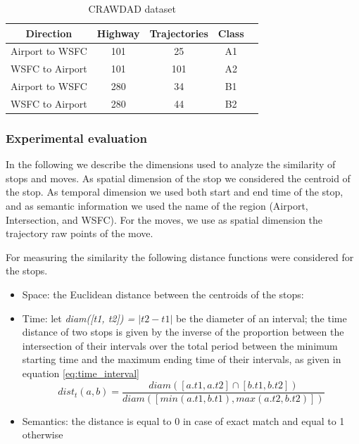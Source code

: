 \documentclass[12pt]{article}
\begin{document}
\begin{table}[h]
\scriptsize
  \centering
  \begin{tabular}{|c|c|c|c|c|}
  	\hline
 Direction & Highway & Trajectories & Class \\
  	\hline
 Airport to WSFC & 101 & 25 & A1\\
 WSFC to Airport & 101 & 101 & A2\\
 Airport to WSFC & 280 & 34 & B1\\
 WSFC to Airport & 280 & 44 & B2\\
    \hline
  \end{tabular}
  \caption{CRAWDAD dataset}
  \label{tab:san_francisco_dataset}
\end{table}

\subsubsection{Experimental evaluation}

In the following we describe the dimensions used to analyze the similarity of stops and moves. As spatial dimension of the stop we considered the centroid of the stop. As temporal dimension we used both start and end time of the stop, and as semantic information we used the name of the region (Airport, Intersection, and WSFC). For the moves, we use as spatial dimension the trajectory raw points of the move.

For measuring the similarity the following distance functions were considered for the stops.
\begin{itemize}
  \item Space: the Euclidean distance between the centroids of the stops:
	\item Time: let \textit{diam([t1, t2]) = $|t2 - t1|$} be the diameter of an interval; the time distance of two stops is given by the inverse of the proportion between the intersection of their intervals over the total period between the minimum starting time and the maximum ending time of their intervals, as given in equation \ref{eq:time_interval}
\begin{equation} \label{eq:time_interval}
	dist_t(a, b) = \dfrac{diam([a.t1, a.t2] \cap [b.t1, b.t2])}{diam([min(a.t1, b.t1), max(a.t2, b.t2)])}
\end{equation}
  \item Semantics: the distance is equal to 0 in case of exact match and equal to 1 otherwise
\end{itemize}
\end{document}
